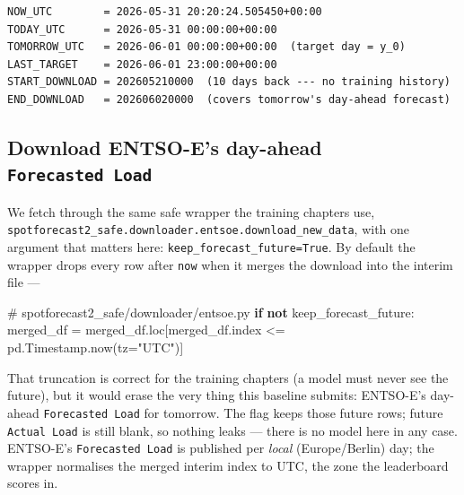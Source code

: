 \documentclass[
  english,
  letterpaper,
]{scrbook}
\newenvironment{Shaded}{\begin{snugshade}}{\end{snugshade}}
\newcommand{\CommentTok}[1]{\textcolor[rgb]{0.37,0.37,0.37}{#1}}
\newcommand{\ControlFlowTok}[1]{\textcolor[rgb]{0.00,0.23,0.31}{\textbf{#1}}}
\newcommand{\KeywordTok}[1]{\textcolor[rgb]{0.00,0.23,0.31}{\textbf{#1}}}
\newcommand{\NormalTok}[1]{\textcolor[rgb]{0.00,0.23,0.31}{#1}}
\newcommand{\OperatorTok}[1]{\textcolor[rgb]{0.37,0.37,0.37}{#1}}
\newcommand{\StringTok}[1]{\textcolor[rgb]{0.13,0.47,0.30}{#1}}
\begin{document}
\begin{verbatim}
NOW_UTC        = 2026-05-31 20:20:24.505450+00:00
TODAY_UTC      = 2026-05-31 00:00:00+00:00
TOMORROW_UTC   = 2026-06-01 00:00:00+00:00  (target day = y_0)
LAST_TARGET    = 2026-06-01 23:00:00+00:00
START_DOWNLOAD = 202605210000  (10 days back --- no training history)
END_DOWNLOAD   = 202606020000  (covers tomorrow's day-ahead forecast)
\end{verbatim}

\subsection{\texorpdfstring{Download ENTSO-E's day-ahead
\texttt{Forecasted\ Load}}{Download ENTSO-E's day-ahead Forecasted Load}}\label{sec-entsoe-query}

We fetch through the same safe wrapper the training chapters use,
\texttt{spotforecast2\_safe.downloader.entsoe.download\_new\_data}, with
one argument that matters here: \texttt{keep\_forecast\_future=True}. By
default the wrapper drops every row after \texttt{now} when it merges
the download into the interim file ---

\begin{Shaded}
\begin{Highlighting}[]
\CommentTok{\# spotforecast2\_safe/downloader/entsoe.py}
\ControlFlowTok{if} \KeywordTok{not}\NormalTok{ keep\_forecast\_future:}
\NormalTok{    merged\_df }\OperatorTok{=}\NormalTok{ merged\_df.loc[merged\_df.index }\OperatorTok{\textless{}=}\NormalTok{ pd.Timestamp.now(tz}\OperatorTok{=}\StringTok{"UTC"}\NormalTok{)]}
\end{Highlighting}
\end{Shaded}

That truncation is correct for the training chapters (a model must never
see the future), but it would erase the very thing this baseline
submits: ENTSO-E's day-ahead \texttt{Forecasted\ Load} for tomorrow. The
flag keeps those future rows; future \texttt{Actual\ Load} is still
blank, so nothing leaks --- there is no model here in any case.
ENTSO-E's \texttt{Forecasted\ Load} is published per \emph{local}
(Europe/Berlin) day; the wrapper normalises the merged interim index to
UTC, the zone the leaderboard scores in.
\end{document}
